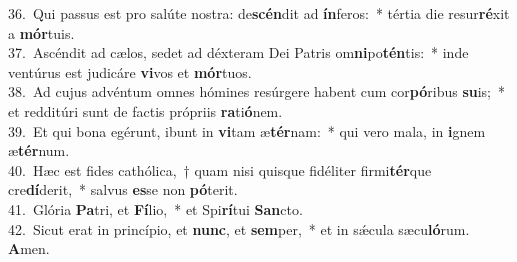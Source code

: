 {36.~}Qui passus est pro salúte nostra: de\textbf{scén}dit ad \textbf{ín}feros:~* tértia die resur\textbf{ré}xit a \textbf{mór}tuis.\\
{37.~}Ascéndit ad cælos, sedet ad déxteram Dei Patris om\textbf{ni}po\textbf{tén}tis:~* inde ventúrus est judicáre \textbf{vi}vos et \textbf{mór}tuos.\\
{38.~}Ad cujus advéntum omnes hómines resúrgere habent cum cor\textbf{pó}ribus \textbf{su}is;~* et redditúri sunt de factis própriis \textbf{ra}ti\textbf{ó}nem.\\
{39.~}Et qui bona egérunt, ibunt in \textbf{vi}tam æ\textbf{tér}nam:~* qui vero mala, in \textbf{i}gnem æ\textbf{tér}num.\\
{40.~}Hæc est fides cathólica,~† quam nisi quisque fidéliter firmi\textbf{tér}que cre\textbf{dí}derit,~* salvus \textbf{es}se non \textbf{pó}terit.\\
{41.~}Glória \textbf{Pa}tri, et \textbf{Fí}lio,~* et Spi\textbf{rí}tui \textbf{San}cto.\\
{42.~}Sicut erat in princípio, et \textbf{nunc}, et \textbf{sem}per,~* et in sǽcula sæcu\textbf{ló}rum. \textbf{A}men.\\
